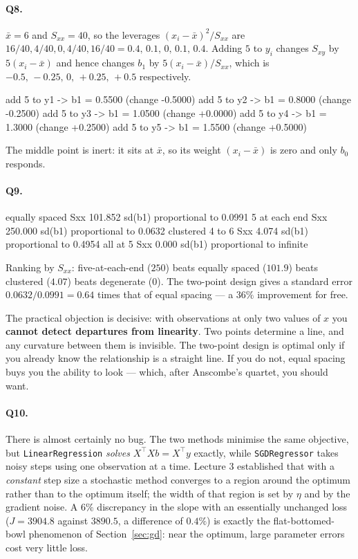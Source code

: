 \documentclass[11pt]{article}
\begin{document}
\paragraph{Q8.} $\bar x = 6$ and $S_{xx} = 40$, so the leverages
$(x_i-\bar x)^2/S_{xx}$ are $16/40, 4/40, 0, 4/40, 16/40 =
0.4,\,0.1,\,0,\,0.1,\,0.4$. Adding $5$ to $y_i$ changes $S_{xy}$ by
$5(x_i - \bar x)$ and hence changes $b_1$ by $5(x_i-\bar x)/S_{xx}$, which is
$-0.5,\,-0.25,\,0,\,+0.25,\,+0.5$ respectively.
\begin{codeout}
    [0.4 0.1 0.  0.1 0.4]
   add 5 to y1 -> b1 = 0.5500 (change -0.5000)
   add 5 to y2 -> b1 = 0.8000 (change -0.2500)
   add 5 to y3 -> b1 = 1.0500 (change +0.0000)
   add 5 to y4 -> b1 = 1.3000 (change +0.2500)
   add 5 to y5 -> b1 = 1.5500 (change +0.5000)
\end{codeout}
The middle point is inert: it sits at $\bar x$, so its weight
$(x_i - \bar x)$ is zero and only $b_0$ responds.

\paragraph{Q9.}
\begin{codeout}
   equally spaced     Sxx  101.852   sd(b1) proportional to 0.0991
   5 at each end      Sxx  250.000   sd(b1) proportional to 0.0632
   clustered 4 to 6   Sxx    4.074   sd(b1) proportional to 0.4954
   all at 5           Sxx    0.000   sd(b1) proportional to infinite
\end{codeout}
Ranking by $S_{xx}$: five-at-each-end ($250$) beats equally spaced ($101.9$)
beats clustered ($4.07$) beats degenerate ($0$). The two-point design gives a
standard error $0.0632/0.0991 = 0.64$ times that of equal spacing --- a $36\%$
improvement for free.

The practical objection is decisive: with observations at only two values of
$x$ you \textbf{cannot detect departures from linearity}. Two points determine
a line, and any curvature between them is invisible. The two-point design is
optimal only if you already know the relationship is a straight line. If you
do not, equal spacing buys you the ability to look --- which, after
Anscombe's quartet, you should want.

\paragraph{Q10.} There is almost certainly no bug. The two methods minimise
the same objective, but \texttt{LinearRegression} \emph{solves}
$X^{\!\top}\!Xb = X^{\!\top}y$ exactly, while \texttt{SGDRegressor} takes
noisy steps using one observation at a time. Lecture 3 established that with a
\emph{constant} step size a stochastic method converges to a region around the
optimum rather than to the optimum itself; the width of that region is set by
$\eta$ and by the gradient noise. A $6\%$ discrepancy in the slope with an
essentially unchanged loss ($J = 3904.8$ against $3890.5$, a difference of
$0.4\%$) is exactly the flat-bottomed-bowl phenomenon of
Section~\ref{sec:gd}: near the optimum, large parameter errors cost very
little loss.
\end{document}

